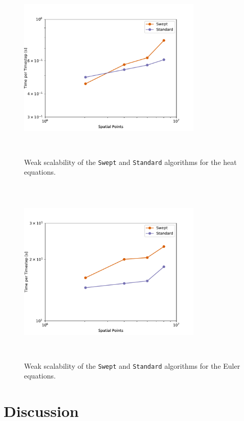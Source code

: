 \documentclass[preprints,article,accept,moreauthors,pdftex]{Definitions/mdpi}
\def\Swept{\texttt{Swept}}
\def\Standard{\texttt{Standard}}
\begin{document}
\begin{figure}[htbp]
    \centering
    \includegraphics[height=9cm,width=0.78\textwidth, trim={0cm 0.75cm 1cm 1.25cm},clip]{figs/weakScalabilityHeat.pdf}
    \caption{Weak scalability of the \Swept{} and \Standard{} algorithms for the heat equations.}
    \label{fig:scalabilityHeat}
\end{figure}

\begin{figure}[htbp]
    \centering
    \includegraphics[height=9cm,width=0.78\textwidth, trim={0cm 0.75cm 1cm 1.25cm},clip]{figs/weakScalabilityEuler.pdf}
    \caption{Weak scalability of the \Swept{} and \Standard{} algorithms for the Euler equations.}
    \label{fig:scalabilityEuler}
\end{figure}



\section{Discussion}
\label{discussion-section}
\end{document}
